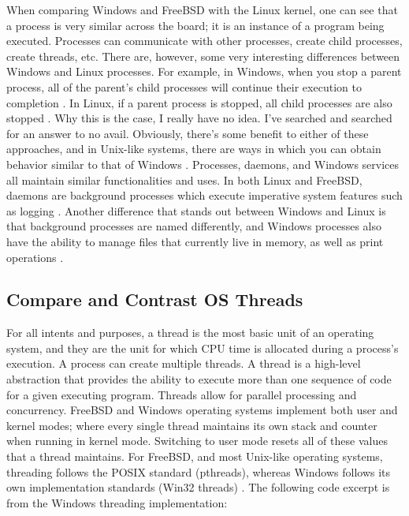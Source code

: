 \documentclass[onecolumn, draftclsnofoot,10pt, compsoc]{IEEEtran}
\begin{document}
\noindent When comparing Windows and FreeBSD with the Linux kernel, one can see that a process is very similar across the board; it is an instance of a program being executed. Processes can communicate with other processes, create child processes, create threads, etc. There are, however, some very interesting differences between Windows and Linux processes. For example, in Windows, when you stop a parent process, all of the parent’s child processes will continue their execution to completion \cite{Processes}. In Linux, if a parent process is stopped, all child processes are also stopped \cite{Processes}. Why this is the case, I really have no idea. I’ve searched and searched for an answer to no avail. Obviously, there’s some benefit to either of these approaches, and in Unix-like systems, there are ways in which you can obtain behavior similar to that of Windows \cite{ProcessBehavior}. Processes, daemons, and Windows services all maintain similar functionalities and uses. In both Linux and FreeBSD, daemons are background processes which execute imperative system features such as logging \cite{FreeBSD2PTCS} \cite{Linux}. Another difference that stands out between Windows and Linux is that background processes are named differently, and Windows processes also have the ability to manage files that currently live in memory, as well as print operations \cite{MSWindows1PTCS}.\\

\subsection{Compare and Contrast OS Threads}
\noindent For all intents and purposes, a thread is the most basic unit of an operating system, and they are the unit for which CPU time is allocated during a process’s execution. A process can create multiple threads. A thread is a high-level abstraction that provides the ability to execute more than one sequence of code for a given executing program. Threads allow for parallel processing and concurrency. FreeBSD and Windows operating systems implement both user and kernel modes; where every single thread maintains its own stack and counter when running in kernel mode. Switching to user mode resets all of these values that a thread maintains. For FreeBSD, and most Unix-like operating systems, threading follows the POSIX standard (pthreads), whereas Windows follows its own implementation standards (Win32 threads) \cite{MSWindows1PTCS} \cite{FreeBSD2PTCS} \cite{PsCreateSystemThread} \cite{MSWindows3PTCS}. The following code excerpt is from the Windows threading implementation:\\
\end{document}

